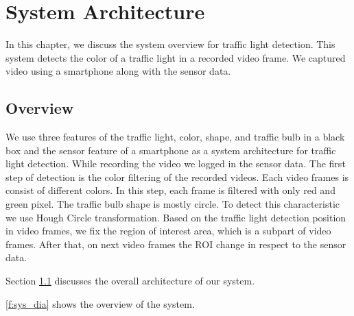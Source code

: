 \chapter{System Architecture}
\label{c:system}
In this chapter, we discuss the system overview for traffic light detection.
This system detects the color of a traffic light in a recorded video frame.
We captured video using a smartphone along with the sensor data.

\section{Overview}
\label{s:archi}
We use three features of the traffic light, color, shape, and traffic bulb in a black box and the sensor feature of a smartphone as a system architecture for traffic light detection.
While recording the video we logged in the sensor data.
The first step of detection is the color filtering of the recorded videos.
Each video frames is consist of different colors.
In this step, each frame is filtered with only red and green pixel.
The traffic bulb shape is mostly circle.
To detect this characteristic we use Hough Circle  transformation\cite{hough_circle}.
Based on the traffic light detection position in video frames, we fix the region of interest area, which is a subpart of video frames.
After that, on next video frames the ROI change in respect to the sensor data. 


Section \ref{s:archi} discusses the overall architecture of our system.

\ref{f:sys_dia} shows the overview of the system.


